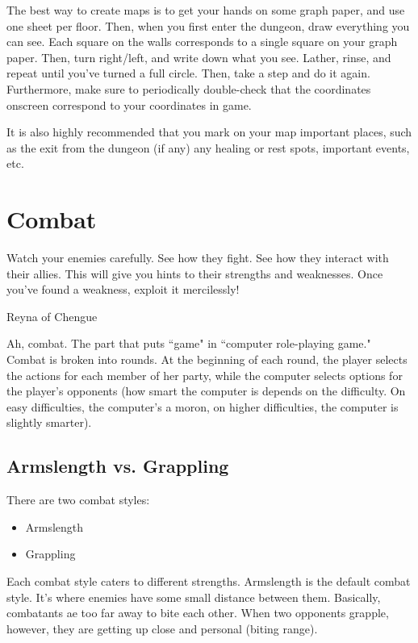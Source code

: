 \documentclass{report}
\begin{document}
    The best way to create maps is to get your hands on some graph paper, and
    use one sheet per floor. Then, when you first enter the dungeon, draw
    everything you can see. Each square on the walls corresponds to a single 
    square on your graph paper. Then, turn right/left, and write down what you
    see. Lather, rinse, and repeat until you've turned a full circle. Then, take a 
    step and do it again. Furthermore, make sure to periodically double-check
    that the coordinates onscreen correspond to your coordinates in game.

    It is also highly recommended that you mark on your map important places,
    such as the exit from the dungeon (if any) any healing or rest spots, important
    events, etc.

\chapter{Combat}
\label{ch_combat}
\epigraph{Watch your enemies carefully. See how they fight. See how
they interact with their allies. This will give you hints to their strengths and
weaknesses. Once you've found a weakness, exploit it mercilessly!}{Reyna of 
Chengue} 

Ah, combat. The part that puts ``game" in ``computer role-playing game." Combat
is broken into rounds. At the beginning of each round, the player selects the 
actions for each member of her party, while the computer selects options for the
player's opponents (how smart the computer is depends on the difficulty. On easy
difficulties, the computer's a moron, on higher difficulties, the computer is
slightly smarter).

\section{Armslength vs. Grappling}

There are two combat styles:
\begin{itemize}
    \item Armslength
    \item Grappling
\end{itemize}

Each combat style caters to different strengths. Armslength is the default combat
style. It's where enemies have some small distance between them. Basically, combatants ae too far
away to bite each other. When two opponents grapple, however, they are getting
up close and personal (biting range).
\end{document}
